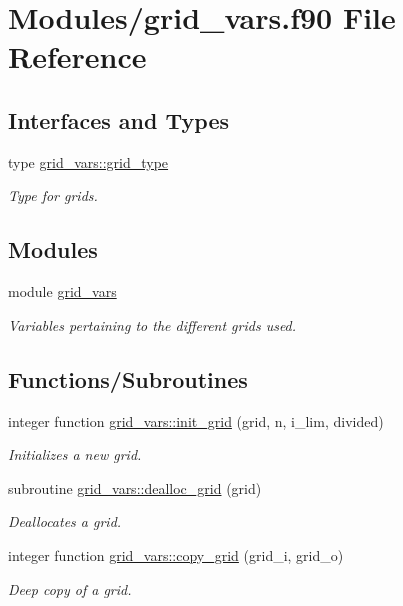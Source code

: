 \hypertarget{grid__vars_8f90}{}\section{Modules/grid\+\_\+vars.f90 File Reference}
\label{grid__vars_8f90}
\subsection*{Interfaces and Types}
\begin{DoxyCompactItemize}
\item 
type \hyperlink{structgrid__vars_1_1grid__type}{grid\+\_\+vars\+::grid\+\_\+type}
\begin{DoxyCompactList}\small\item\em Type for grids. \end{DoxyCompactList}\end{DoxyCompactItemize}
\subsection*{Modules}
\begin{DoxyCompactItemize}
\item 
module \hyperlink{namespacegrid__vars}{grid\+\_\+vars}
\begin{DoxyCompactList}\small\item\em Variables pertaining to the different grids used. \end{DoxyCompactList}\end{DoxyCompactItemize}
\subsection*{Functions/\+Subroutines}
\begin{DoxyCompactItemize}
\item 
integer function \hyperlink{namespacegrid__vars_aa0d888796fd875e9024443e46eeb11f8}{grid\+\_\+vars\+::init\+\_\+grid} (grid, n, i\+\_\+lim, divided)
\begin{DoxyCompactList}\small\item\em Initializes a new grid. \end{DoxyCompactList}\item 
subroutine \hyperlink{namespacegrid__vars_abc8ea59261a1e773754afebdb13276f9}{grid\+\_\+vars\+::dealloc\+\_\+grid} (grid)
\begin{DoxyCompactList}\small\item\em Deallocates a grid. \end{DoxyCompactList}\item 
integer function \hyperlink{namespacegrid__vars_a6fa9a9920f1a700d50075bc9c291a247}{grid\+\_\+vars\+::copy\+\_\+grid} (grid\+\_\+i, grid\+\_\+o)
\begin{DoxyCompactList}\small\item\em Deep copy of a grid. \end{DoxyCompactList}\end{DoxyCompactItemize}
